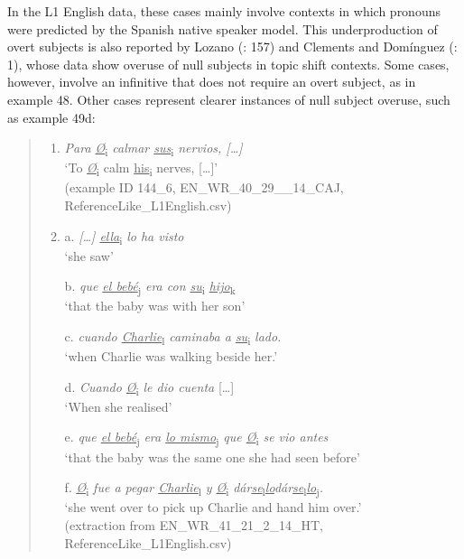 \documentclass[
  letterpaper,
  DIV=11,
  numbers=noendperiod]{scrartcl}
\begin{document}
In the L1 English data, these cases mainly involve contexts in which
pronouns were predicted by the Spanish native speaker model. This
underproduction of overt subjects is also reported by Lozano
(: 157) and Clements and Domínguez
(: 1), whose data show
overuse of null subjects in topic shift contexts. Some cases, however,
involve an infinitive that does not require an overt subject, as in
example 48. Other cases represent clearer instances of null subject
overuse, such as example 49d:

\begin{quote}
\begin{enumerate}
\def\labelenumi{\arabic{enumi}.}
\setcounter{enumi}{47}
\item
  \emph{Para \ul{Ø}}\textsubscript{i} \emph{calmar
  \ul{sus}}\textsubscript{i} \emph{nervios, {[}\ldots{]}}\\
  `To \ul{\emph{Ø}}\textsubscript{i} calm \ul{his}\textsubscript{i}
  nerves, {[}\ldots{]}'\\
  (example ID 144\_6, EN\_WR\_40\_29\_\_14\_CAJ,
  ReferenceLike\_L1English.csv)
\item
  a. \emph{{[}\ldots{]} \ul{ella}}\textsubscript{i} \emph{lo ha visto}\\
  `she saw'

  b. \emph{que \ul{el bebé}}\textsubscript{j} \emph{era con
  \ul{su}}\textsubscript{i} \ul{\emph{hijo}}\textsubscript{k}\\
  `that the baby was with her son'

  c. \emph{cuando \ul{Charlie}}\textsubscript{l} \emph{caminaba a
  \ul{su}}\textsubscript{i} \emph{lado.}\\
  `when Charlie was walking beside her.'

  d. \emph{Cuando \ul{Ø}}\textsubscript{i} \emph{le dio cuenta}
  {[}\ldots{]}\\
  `When she realised'

  e. \emph{que \ul{el bebé}}\textsubscript{j} \emph{era \ul{lo
  mismo}}\textsubscript{j} \emph{que \ul{Ø}}\textsubscript{i} \emph{se
  vio antes}\\
  `that the baby was the same one she had seen before'

  f. \ul{\emph{Ø}}\textsubscript{i} \emph{fue a pegar
  \ul{Charlie}}\textsubscript{l} \emph{y \ul{Ø}}\textsubscript{i}
  \emph{dár\ul{se}}\textsubscript{l}\ul{\emph{lo}}\emph{dár\ul{se}}\textsubscript{l}\ul{\emph{lo}}\textsubscript{j}\emph{.}\\
  `she went over to pick up Charlie and hand him over.'\\
  (extraction from EN\_WR\_41\_21\_2\_14\_HT,
  ReferenceLike\_L1English.csv)
\end{enumerate}
\end{quote}
\end{document}
